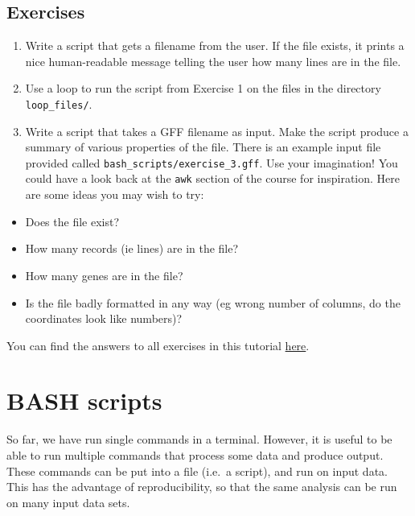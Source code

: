 \documentclass[11pt]{article}
\providecommand{\tightlist}{%
      \setlength{\itemsep}{0pt}\setlength{\parskip}{0pt}}
\begin{document}
    \hypertarget{exercises}{%
\subsection{Exercises}\label{exercises}}

\begin{enumerate}
\def\labelenumi{\arabic{enumi}.}
\tightlist
\item
  Write a script that gets a filename from the user. If the file exists,
  it prints a nice human-readable message telling the user how many
  lines are in the file.
\item
  Use a loop to run the script from Exercise 1 on the files in the
  directory \texttt{loop\_files/}.
\item
  Write a script that takes a GFF filename as input. Make the script
  produce a summary of various properties of the file. There is an
  example input file provided called
  \texttt{bash\_scripts/exercise\_3.gff}. Use your imagination! You
  could have a look back at the \texttt{awk} section of the course for
  inspiration. Here are some ideas you may wish to try:
\end{enumerate}

\begin{itemize}
\tightlist
\item
  Does the file exist?
\item
  How many records (ie lines) are in the file?
\item
  How many genes are in the file?
\item
  Is the file badly formatted in any way (eg wrong number of columns, do
  the coordinates look like numbers)?
\end{itemize}

You can find the answers to all exercises in this tutorial
\href{answers.ipynb}{here}.





\newpage





    \hypertarget{bash-scripts}{%
\section{BASH scripts}\label{bash-scripts}}

So far, we have run single commands in a terminal. However, it is useful
to be able to run multiple commands that process some data and produce
output. These commands can be put into a file (i.e.~a script), and run
on input data. This has the advantage of reproducibility, so that the
same analysis can be run on many input data sets.
\end{document}

